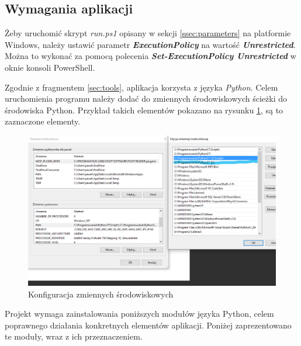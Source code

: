 \subsection{Wymagania aplikacji}
\label{ssec:apprequirements}
Żeby uruchomić skrypt \emph{run.ps1} opisany w sekcji \ref{ssec:parameters} na platformie Windows, należy ustawić parametr \emph{\textbf{ExecutionPolicy}} na wartość \emph{\textbf{Unrestricted}}. Można to wykonać za pomocą polecenia \emph{\textbf{Set-ExecutionPolicy Unrestricted}} w oknie konsoli PowerShell.\par
Zgodnie z fragmentem \ref{sec:tools}, aplikacja korzysta z języka \emph{Python}. Celem uruchomienia programu należy dodać do zmiennych środowiskowych ścieżki do środowiska Python. Przykład takich elementów pokazano na rysunku \ref{fig:path}, są to zaznaczone elementy.
\begin{figure}[H]
        \centering
        \captionsetup{justification=centering,margin=2cm}
        \includegraphics[width=\linewidth]{resources/path.png}
        \caption{Konfiguracja zmiennych środowiskowych}
        \label{fig:path}
\end{figure}
Projekt wymaga zainstalowania poniższych modułów języka Python, celem poprawnego działania konkretnych elementów aplikacji. Poniżej zaprezentowano te moduły, wraz z ich przeznaczeniem.\par
